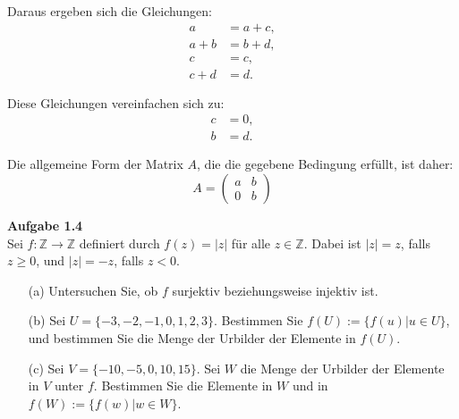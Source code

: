 \documentclass[%
    12pt,
    a4paper,
    ngerman,
    headheight=29.1pt,
]{scrartcl}
\newcommand{\Aufgabe}[1]{
  {
  \vspace*{0.5cm}
  \textsf{\textbf{Aufgabe #1}}
  \vspace*{0.2cm}
  }
}
\begin{document}
Daraus ergeben sich die Gleichungen:
\begin{align*}
a &= a+c, \\
a+b &= b+d, \\
c &= c, \\
c+d &= d.
\end{align*}

Diese Gleichungen vereinfachen sich zu:
\begin{align*}
c &= 0, \\
b &= d.
\end{align*}

Die allgemeine Form der Matrix \( A \), die die gegebene Bedingung erfüllt, ist daher:
\[
A = \begin{pmatrix}
a & b \\
0 & b
\end{pmatrix}
\]

\Aufgabe{1.4} \\
Sei \( f : \mathbb{Z} \to \mathbb{Z} \) definiert durch \( f(z) = |z| \) für alle \( z \in \mathbb{Z} \). Dabei ist \( |z| = z \), falls \( z \geq 0 \), und \( |z| = -z \), falls \( z < 0 \).

\begin{enumerate}
    \item[(a)] Untersuchen Sie, ob \( f \) surjektiv beziehungsweise injektiv ist.
    \item[(b)] Sei \( U = \{-3, -2, -1, 0, 1, 2, 3\} \). Bestimmen Sie \( f(U) := \{ f(u) | u \in U \} \), und bestimmen Sie die Menge der Urbilder der Elemente in \( f(U) \).
    \item[(c)] Sei \( V = \{-10, -5, 0, 10, 15\} \). Sei \( W \) die Menge der Urbilder der Elemente in \( V \) unter \( f \). Bestimmen Sie die Elemente in \( W \) und in \( f(W) := \{ f(w) | w \in W \} \).
\end{enumerate}
\end{document}
